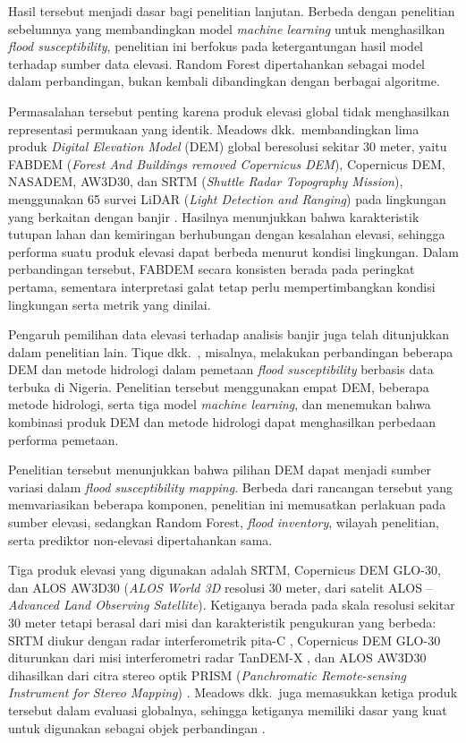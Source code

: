 \documentclass[12pt,a4paper]{article}
\begin{document}
Hasil tersebut menjadi dasar bagi penelitian lanjutan. Berbeda dengan
penelitian sebelumnya yang membandingkan model \textit{machine learning}
untuk menghasilkan \textit{flood susceptibility}, penelitian ini berfokus
pada ketergantungan hasil model terhadap sumber data elevasi.
Random Forest dipertahankan sebagai model dalam perbandingan, bukan kembali
dibandingkan dengan berbagai algoritme.

Permasalahan tersebut penting karena produk elevasi global tidak menghasilkan
representasi permukaan yang identik. Meadows dkk.\ membandingkan lima produk
\textit{Digital Elevation Model} (DEM) global beresolusi sekitar 30 meter,
yaitu FABDEM (\textit{Forest And Buildings removed Copernicus DEM}),
Copernicus DEM, NASADEM, AW3D30, dan SRTM (\textit{Shuttle Radar Topography
Mission}), menggunakan 65 survei LiDAR (\textit{Light Detection and Ranging})
pada lingkungan yang
berkaitan dengan banjir \citep{meadows2024}. Hasilnya menunjukkan bahwa
karakteristik tutupan lahan dan kemiringan berhubungan dengan kesalahan
elevasi, sehingga performa suatu produk elevasi dapat berbeda menurut kondisi
lingkungan. Dalam perbandingan tersebut, FABDEM secara konsisten berada
pada peringkat pertama, sementara interpretasi galat tetap perlu
mempertimbangkan kondisi lingkungan serta metrik yang dinilai.

Pengaruh pemilihan data elevasi terhadap analisis banjir juga telah
ditunjukkan dalam penelitian lain. Tique dkk.\ \citep{Tique2026}, misalnya,
melakukan perbandingan beberapa DEM dan metode hidrologi dalam pemetaan
\textit{flood susceptibility} berbasis data terbuka di Nigeria. Penelitian tersebut
menggunakan empat DEM, beberapa metode hidrologi, serta tiga model
\textit{machine learning}, dan menemukan bahwa kombinasi produk DEM dan
metode hidrologi dapat menghasilkan perbedaan performa pemetaan.

Penelitian tersebut menunjukkan bahwa pilihan DEM dapat menjadi sumber
variasi dalam \textit{flood susceptibility mapping}. Berbeda dari rancangan
tersebut yang memvariasikan beberapa komponen, penelitian ini memusatkan
perlakuan pada sumber elevasi, sedangkan Random Forest, \textit{flood inventory},
wilayah penelitian, serta prediktor non-elevasi dipertahankan sama.

Tiga produk elevasi yang digunakan adalah SRTM, Copernicus DEM GLO-30, dan
ALOS AW3D30 (\textit{ALOS World 3D} resolusi 30 meter, dari satelit
ALOS -- \textit{Advanced Land Observing Satellite}). Ketiganya berada pada
skala resolusi sekitar 30 meter tetapi
berasal dari misi dan karakteristik pengukuran yang berbeda: SRTM diukur
dengan radar interferometrik pita-C \citep{farr2007}, Copernicus DEM GLO-30
diturunkan dari misi interferometri radar TanDEM-X \citep{esa_glo30}, dan
ALOS AW3D30 dihasilkan dari citra stereo optik PRISM
(\textit{Panchromatic Remote-sensing Instrument for Stereo Mapping})
\citep{tadono2016}. Meadows dkk.\ juga
memasukkan ketiga produk tersebut dalam evaluasi globalnya, sehingga ketiganya
memiliki dasar yang kuat untuk digunakan sebagai objek perbandingan
\citep{meadows2024}.
\end{document}
